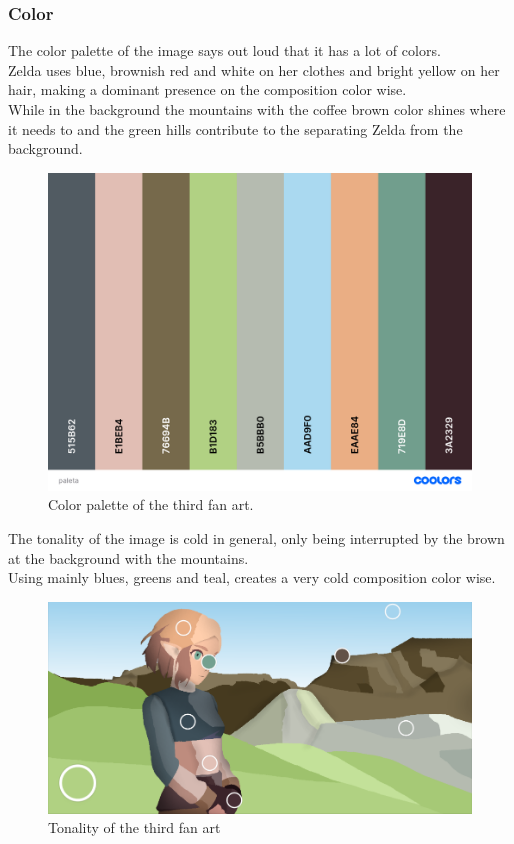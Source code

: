 \documentclass{cup-pan}
\begin{document}
        \subsubsection{Color}
            
            The color palette of the image says out loud that it has a lot of colors.\\
            Zelda uses blue, brownish red and white on her clothes and bright yellow on her hair, making a dominant presence on the composition color wise.\\
            While in the background the mountains with the coffee brown color shines where it needs to and the green hills contribute to the separating Zelda from the background. \\
            \begin{figure}[H]
                \includegraphics[width=\textwidth]{Fanart3/0_Analisi/paleta.png}
                \caption{Color palette of the third fan art.}
            \end{figure}

            The tonality of the image is cold in general, only being interrupted by the brown at the background with the mountains.\\
            Using mainly blues, greens and teal, creates a very cold composition color wise. 
            \begin{figure}[H]
                \includegraphics[width=\textwidth]{Fanart3/0_Analisi/tonality.png}
                \caption{Tonality of the third fan art}
            \end{figure}
\end{document}
